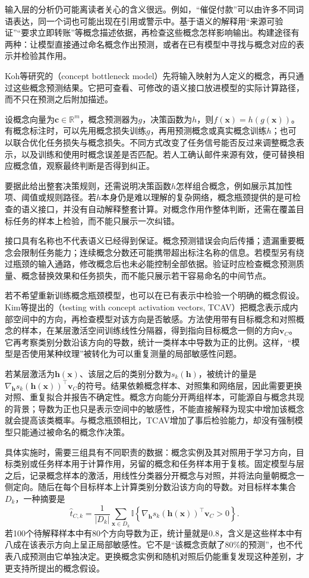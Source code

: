 输入层的分析仍可能离读者关心的含义很远。例如，“催促付款”可以由许多不同词语表达，同一个词也可能出现在引用或警示中。基于语义的解释用“来源可验证”“要求立即转账”等概念描述依据，再检查这些概念怎样影响输出。构建途径有两种：让模型直接通过命名概念作出预测，或者在已有模型中寻找与概念对应的表示并检验其作用。

Koh等研究的（concept bottleneck model）先将输入映射为人定义的概念，再只通过这些概念预测结果。它把可查看、可修改的语义接口放进模型的实际计算路径，而不只在预测之后附加描述。

设概念向量为$\bm{c}\in\mathbb R^m$，概念预测器为$g$，决策函数为$h$，则$f(\bm{x})=h(g(\bm{x}))$。有概念标注时，可以先用概念损失训练$g$，再用预测概念或真实概念训练$h$；也可以联合优化任务损失与概念损失。不同方式改变了任务信号能否反过来调整概念表示，以及训练和使用时概念误差是否匹配。若人工确认邮件来源有效，便可替换相应概念值，观察最终判断是否得到纠正。

要据此给出整套决策规则，还需说明决策函数$h$怎样组合概念，例如展示其加性项、阈值或规则路径。若$h$本身仍是难以理解的复杂网络，概念瓶颈提供的是可检查的语义接口，并没有自动解释整套计算。对概念作用作整体判断，还需在覆盖目标任务的样本上检验，而不能只展示一次纠错。

接口具有名称也不代表语义已经得到保证。概念预测错误会向后传播；遗漏重要概念会限制任务能力；连续概念分数还可能携带超出标注名称的信息。若模型另有绕过瓶颈的输入通路，修改概念后也未必能控制全部依据。验证时应检查概念预测质量、概念替换效果和任务损失，而不能只展示若干容易命名的中间节点。

若不希望重新训练概念瓶颈模型，也可以在已有表示中检验一个明确的概念假设。Kim等提出的（testing with concept activation vectors, TCAV）把概念表示成内部空间中的方向，再检查模型对该方向是否敏感。方法使用带有目标概念和对照概念的样本，在某层激活空间训练线性分隔器，得到指向目标概念一侧的方向$\bm{v}_C$。它再考察类别分数沿该方向的导数，统计一类样本中导数为正的比例。这样，“模型是否使用某种纹理”被转化为可以重复测量的局部敏感性问题。

若某层激活为$\bm{h}(\bm{x})$、该层之后的类别分数为$s_k(\bm{h})$，被统计的量是$\nabla_{\bm h}s_k(\bm{h}(\bm{x}))^\top\bm{v}_C$的符号。结果依赖概念样本、对照集和网络层，因此需要更换对照、重复拟合并报告不确定性。概念方向能分开两组样本，可能源自与概念共现的背景；导数为正也只是表示空间中的敏感性，不能直接解释为现实中增加该概念就会提高该类概率。与概念瓶颈相比，TCAV增加了事后检验能力，却没有强制模型只能通过被命名的概念作决策。

具体实施时，需要三组具有不同职责的数据：概念实例及其对照用于学习方向，目标类别或任务样本用于计算作用，另留的概念和任务样本用于复核。固定模型与层之后，记录概念样本的激活，用线性分类器分开概念与对照，并将法向量朝概念一侧定向。随后在每个目标样本上计算类别分数沿该方向的导数。对目标样本集合$D_k$，一种摘要是
\[
 \widehat t_{C,k}
 =\frac1{|D_k|}\sum_{\bm{x}\in D_k}
 \mathbb I\!\left\{
 \nabla_{\bm h}s_k(\bm h(\bm{x}))^\top\bm v_C>0
 \right\}.
\]
若100个待解释样本中有80个方向导数为正，统计量就是0.8，含义是这些样本中有八成在该表示方向上呈正局部敏感性。它不是“该概念贡献了80\%的预测”，也不代表八成预测由它单独决定。更换概念实例和随机对照后仍能重复发现这种差别，才更支持所提出的概念假设。

